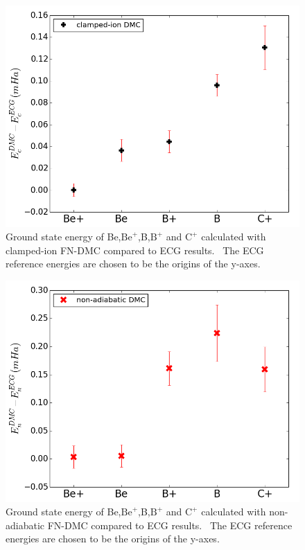 \documentclass[pra,superscriptaddress,groupedaddress,twocolumn]{revtex4}
\begin{document}
\begin{figure}
\centering
\includegraphics[scale=.4]{Figures/ad-ECG}
\caption{Ground state energy of Be,$\text{Be}^+$,B,$\text{B}^+$ and $\text{C}^+$ calculated with clamped-ion FN-DMC compared to ECG results.~\cite{Stanke_Be,Puchalski_Be+,Bubin_B,Bubin_B+,Bubin_C+} The ECG reference energies are chosen to be the origins of the y-axes. \label{fig:ad-atoms}}
\end{figure}

\begin{figure}
\centering
\includegraphics[scale=.4]{Figures/nad-ECG}
\caption{Ground state energy of Be,$\text{Be}^+$,B,$\text{B}^+$ and $\text{C}^+$ calculated with non-adiabatic FN-DMC compared to ECG results.~\cite{Bubin_BeH_noBO,Bubin_B,Bubin_B+,Bubin_C+} The ECG reference energies are chosen to be the origins of the y-axes. \label{fig:nad-atoms}}
\end{figure}
\end{document}
